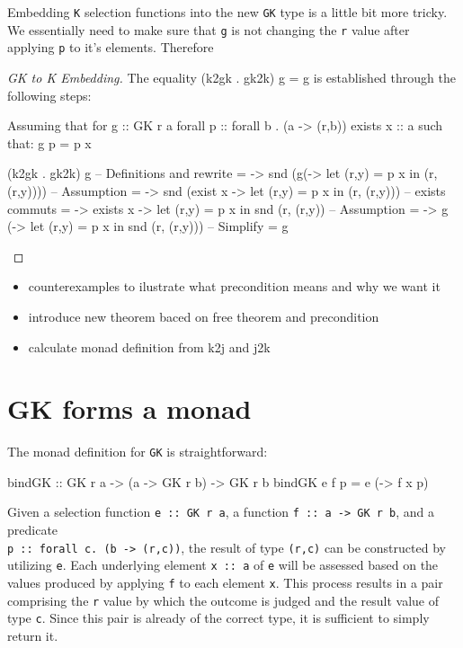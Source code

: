 \documentclass[runningheads]{llncs}
\providecommand{\tightlist}{%
  \setlength{\itemsep}{0pt}\setlength{\parskip}{0pt}}
\begin{document}
Embedding \texttt{K} selection functions into the new \texttt{GK} type
is a little bit more tricky. We essentially need to make sure that
\texttt{g} is not changing the \texttt{r} value after applying
\texttt{p} to it's elements. Therefore

\begin{proof}[GK to K Embedding]
The equality (k2gk . gk2k) g = g is established through the following steps:

Assuming that for 
g :: GK r a
forall p :: forall b . (a -> (r,b))
exists x :: a
such that:
g p = p x

\begin{haskell}
(k2gk . gk2k) g
-- {{ Definitions and rewrite }}
= \p -> snd (g(\x -> let (r,y) = p x in (r, (r,y))))
-- {{ Assumption }}
= \p -> snd (exist x -> let (r,y) = p x in (r, (r,y)))
-- {{ exists commuts }}
= \p -> exists x -> let (r,y) = p x in snd (r, (r,y))
-- {{ Assumption }}
= \p -> g (\x -> let (r,y) = p x in snd (r, (r,y)))
-- {{ Simplify }}
= g
\end{haskell}
\end{proof}

\begin{itemize}
\tightlist
\item
  counterexamples to ilustrate what precondition means and why we want
  it
\item
  introduce new theorem baced on free theorem and precondition
\item
  calculate monad definition from k2j and j2k
\end{itemize}

\section{GK forms a monad}\label{gk-forms-a-monad}

The monad definition for \texttt{GK} is straightforward:

\begin{code}
bindGK :: GK r a -> (a -> GK r b) -> GK r b
bindGK e f p = e (\x -> f x p)
\end{code}

Given a selection function \texttt{e\ ::\ GK\ r\ a}, a function
\texttt{f\ ::\ a\ -\textgreater{}\ GK\ r\ b}, and a predicate\\
\texttt{p\ ::\ forall\ c.\ (b\ -\textgreater{}\ (r,c))}, the result of
type \texttt{(r,c)} can be constructed by utilizing \texttt{e}. Each
underlying element \texttt{x\ ::\ a} of \texttt{e} will be assessed
based on the values produced by applying \texttt{f} to each element
\texttt{x}. This process results in a pair comprising the \texttt{r}
value by which the outcome is judged and the result value of type
\texttt{c}. Since this pair is already of the correct type, it is
sufficient to simply return it.
\end{document}
